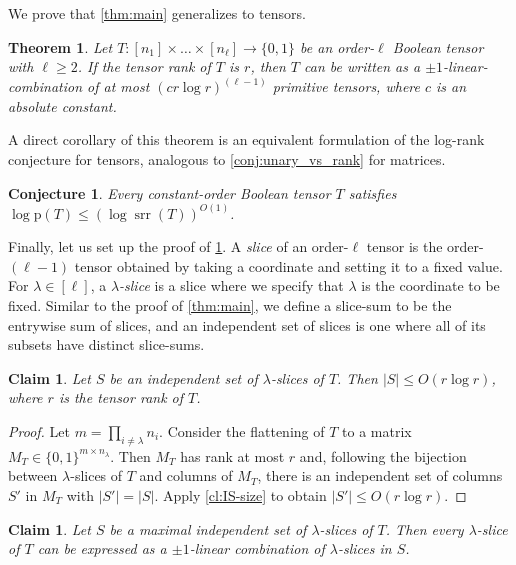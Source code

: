 \documentclass[11pt]{article}
\theoremstyle{plain}
\newtheorem{theorem}[thm]{Theorem}
\newtheorem{conjecture}[thm]{Conjecture}
\newtheorem{claim}[thm]{Claim}
\theoremstyle{remark}
\def\p{{\mathrm{p}}}
\DeclareMathOperator{\ur}{srr}
\begin{document}
We prove that \cref{thm:main} generalizes to tensors.

\begin{theorem} \label{thm:tensors}
	Let $T: [n_1] \times \ldots \times [n_\ell] \to \{0, 1\}$ be an order-$\ell$ Boolean tensor with $\ell \geq 2$. If the tensor rank of $T$ is $r$, then $T$ can be written as a $\pm 1$-linear-combination of at most $(c r \log r)^{(\ell - 1)}$ primitive tensors, where $c$ is an absolute constant.
\end{theorem}

A direct corollary of this theorem is an equivalent formulation of the log-rank conjecture for tensors, analogous to \cref{conj:unary_vs_rank} for matrices.

\begin{conjecture}
	\label{conj:unary_vs_rank_tensors}
	Every constant-order Boolean tensor $T$ satisfies $\log \p(T) \leq (\log \ur(T))^{O(1)}$.
\end{conjecture}

Finally, let us set up the proof of \cref{thm:tensors}. A \emph{slice} of an order-$\ell$ tensor is the order-$(\ell-1)$ tensor obtained by taking a coordinate and setting it to a fixed value. For $\lambda \in [\ell]$, a \emph{$\lambda$-slice} is a slice where we specify that $\lambda$ is the coordinate to be fixed. Similar to the proof of \cref{thm:main}, we define a slice-sum to be the entrywise sum of slices, and an independent set of slices is one where all of its subsets have distinct slice-sums.

\begin{claim} \label{cl:IS-tensors}
	Let $S$ be an independent set of $\lambda$-slices of $T$. Then $|S| \leq O(r \log r)$, where $r$ is the tensor rank of $T$.
\end{claim}
\begin{proof}
	Let $m = \prod_{i \ne \lambda} n_i$.
	Consider the flattening of $T$ to a matrix $M_T \in \{0, 1\}^{m \times n_{\lambda}}$. Then $M_T$ has rank at most $r$ and, following the bijection between $\lambda$-slices of $T$ and columns of $M_T$, there is an independent set of columns $S'$ in $M_T$ with $|S'| = |S|$. Apply \cref{cl:IS-size} to obtain $|S'| \leq O(r \log r)$.
\end{proof}

\begin{claim}\label{cl:tensor_linear_combin}
	Let $S$ be a maximal independent set of $\lambda$-slices of $T$.  Then every $\lambda$-slice of $T$ can be expressed as a  $\pm 1$-linear combination of  $\lambda$-slices in $S$.
\end{claim}
\end{document}
